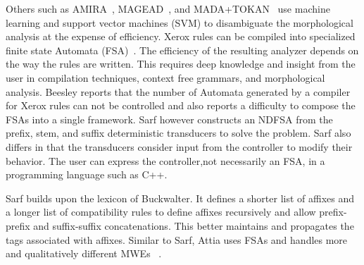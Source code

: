 \documentclass[11pt]{article}
\begin{document}
Others such as 
AMIRA~\cite{Diab:07,Benajiba:07},
MAGEAD~\cite{Habash:05}, and MADA+TOKAN~\cite{Habash:09} 
use machine learning and support vector machines (SVM) 
to disambiguate the morphological analysis at the expense 
of efficiency.
Xerox rules can be compiled into specialized 
finite state Automata (FSA)~\cite{Beesley:03}.
The efficiency of the resulting analyzer depends on the
way the rules are written. 
This requires deep knowledge and insight from the user
in compilation techniques, context free grammars, 
and morphological analysis.
Beesley reports that the number of Automata generated by a compiler
for Xerox rules can not be controlled and also reports a difficulty 
to compose the FSAs into a single framework. 
Sarf however constructs an NDFSA from 
the prefix, stem, and suffix deterministic 
transducers to solve the problem.
Sarf also differs in that 
the transducers consider
input from the controller to modify their behavior.
The user can express the controller,not necessarily an FSA, in a programming language such as C++.

Sarf builds upon the lexicon of Buckwalter. %
It defines a shorter list of affixes
and a longer list of 
compatibility rules to define 
affixes recursively and allow 
prefix-prefix and suffix-suffix 
concatenations.
This better maintains and propagates 
the tags associated with affixes. 
Similar to Sarf, Attia uses FSAs and handles more and qualitatively different MWEs
~\cite{Attia:06,Attia:10}.
\end{document}
